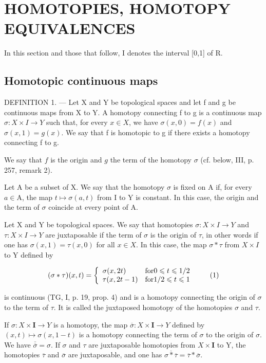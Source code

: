 \section{HOMOTOPIES, HOMOTOPY EQUIVALENCES}

In this section and those that follow, I denotes the interval {[}0,1{]} of R.

\subsection{Homotopic continuous maps}

DEFINITION 1. --- Let X and Y be topological spaces and let f and g be continuous maps from X to Y. A homotopy connecting f to g is a continuous map \(\sigma: X \times I \to Y\) such that, for every \(x \in X\), we have \(\sigma(x,0) = f(x)\) and \(\sigma(x,1) = g(x)\). We say that f is homotopic to g if there exists a homotopy connecting f to g.

We say that \(f\) is the origin and \(g\) the term of the homotopy \(\sigma\) (cf. below, III, p. 257, remark 2).

Let A be a subset of X. We say that the homotopy \(\sigma\) is fixed on A if, for every \(a \in \mathrm{A}\), the map \(t \mapsto \sigma(a, t)\) from I to Y is constant. In this case, the origin and the term of \(\sigma\) coincide at every point of A.

Let X and Y be topological spaces. We say that homotopies \(\sigma\colon X\times I\to Y\) and \(\tau\colon X\times I\to Y\) are juxtaposable if the term of \(\sigma\) is the origin of \(\tau\), in other words if one has \(\sigma(x,1)=\tau(x,0)\) for all \(x\in X\). In this case, the map \(\sigma*\tau\) from \(X\times I\) to Y defined by

\[
(\sigma * \tau) (x, t) = \left\{ \begin{array}{l l} \sigma (x, 2 t) & \text {for} 0 \leqslant t \leqslant 1 / 2 \\ \tau (x, 2 t - 1) & \text {for} 1 / 2 \leqslant t \leqslant 1 \end{array} \right.\tag{1}
\]

is continuous (TG, I, p. 19, prop. 4) and is a homotopy connecting the origin of \(\sigma\) to the term of \(\tau\). It is called the juxtaposed homotopy of the homotopies \(\sigma\) and \(\tau\).

If \(\sigma\colon X\times\mathbf{I}\to Y\) is a homotopy, the map \(\overline{\sigma}\colon X\times\mathbf{I}\to Y\) defined by \((x,t)\mapsto\sigma(x,1-t)\) is a homotopy connecting the term of \(\sigma\) to the origin of \(\sigma\). We have \(\overline{\overline{\sigma}}=\sigma\). If \(\sigma\) and \(\tau\) are juxtaposable homotopies from \(X\times\mathbf{I}\) to Y, the homotopies \(\overline{\tau}\) and \(\overline{\sigma}\) are juxtaposable, and one has \(\overline{\sigma*\overline{\tau}}=\overline{\tau}*\overline{\sigma}\).

